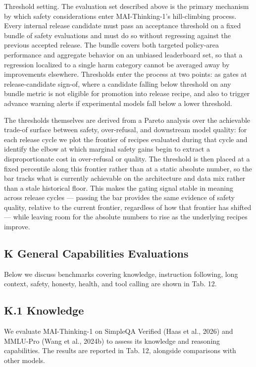\documentclass[
  10
]{article}
\begin{document}
Threshold setting. The evaluation set described above is the primary
mechanism by which safety considerations enter MAI-Thinking-1's
hill-climbing process. Every internal release candidate must pass an
acceptance threshold on a fixed bundle of safety evaluations and must do
so without regressing against the previous accepted release. The bundle
covers both targeted policy-area performance and aggregate behavior on
an unbiased leaderboard set, so that a regression localized to a single
harm category cannot be averaged away by improvements elsewhere.
Thresholds enter the process at two points: as gates at
release-candidate sign-of, where a candidate falling below threshold on
any bundle metric is not eligible for promotion into release recipe, and
also to trigger advance warning alerts if experimental models fall below
a lower threshold.

The thresholds themselves are derived from a Pareto analysis over the
achievable trade-of surface between safety, over-refusal, and downstream
model quality: for each release cycle we plot the frontier of recipes
evaluated during that cycle and identify the elbow at which marginal
safety gains begin to extract a disproportionate cost in over-refusal or
quality. The threshold is then placed at a fixed percentile along this
frontier rather than at a static absolute number, so the bar tracks what
is currently achievable on the architecture and data mix rather than a
stale historical floor. This makes the gating signal stable in meaning
across release cycles --- passing the bar provides the same evidence of
safety quality, relative to the current frontier, regardless of how that
frontier has shifted --- while leaving room for the absolute numbers to
rise as the underlying recipes improve.

\subsection{K General Capabilities
Evaluations}\label{k-general-capabilities-evaluations}

Below we discuss benchmarks covering knowledge, instruction following,
long context, safety, honesty, health, and tool calling are shown in
Tab. 12.

\subsection{K.1 Knowledge}\label{k.1-knowledge}

We evaluate MAI-Thinking-1 on SimpleQA Verified (Haas et al., 2026) and
MMLU-Pro (Wang et al., 2024b) to assess its knowledge and reasoning
capabilities. The results are reported in Tab. 12, alongside comparisons
with other models.
\end{document}
